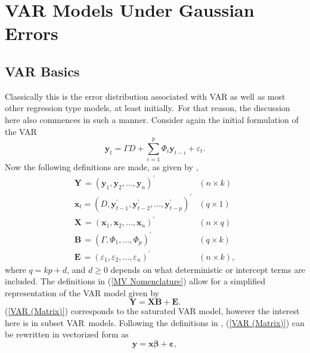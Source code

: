 
\chapter{VAR Models Under Gaussian Errors}


\section{VAR Basics}

Classically this is the error distribution associated with VAR as
well as most other regression type models, at least initially.\ For
that reason, the discussion here also commences in such a manner.
Consider again the initial formulation of the VAR
\begin{equation}
\mathbf{y}_{t}=\Gamma D+\sum_{i=1}^{p}\Phi_{i}\mathbf{y}_{t-i}+\varepsilon_{t}.\label{VAR (Basic)}
\end{equation}
Now the following definitions are made, as given by \citet{Luetk:1993},
\begin{equation}
\begin{array}{ll}
\mathbf{Y}\,=\left(\mathbf{y}_{1},\mathbf{y}_{2},\ldots,\mathbf{y}_{n}\right)^{\prime} & \left(n\times k\right)\\
\mathbf{x}_{t}=\left(D,\mathbf{y}_{t-1}^{\prime},\mathbf{y}_{t-2}^{\prime},\ldots,\mathbf{y}_{t-p}^{\prime}\right)^{\prime} & (q\times1)\\
\mathbf{X}\,=\left(\mathbf{x}_{1},\mathbf{x}_{2},\ldots,\mathbf{x}_{n}\right)^{\prime} & \left(n\times q\right)\\
\mathbf{B}\,=\left(\Gamma,\Phi_{1},\ldots,\Phi_{p}\right)^{\prime} & \left(q\times k\right)\\
\mathbf{E}\,=\left(\varepsilon_{1},\varepsilon_{2},\ldots,\varepsilon_{n}\right)^{\prime} & \left(n\times k\right),
\end{array}\label{MV Nomenclature}
\end{equation}
where $q=kp+d$, and $d\geq0$ depends on what deterministic or intercept
terms are included. The definitions in (\ref{MV Nomenclature}) allow
for a simplified representation of the VAR model given by
\begin{equation}
\mathbf{Y}=\mathbf{XB}+\mathbf{E.}\label{VAR (Matrix)}
\end{equation}
(\ref{VAR (Matrix)}) corresponds to the saturated VAR model, however
the interest here is in subset VAR\ models. Following the definitions
in \citet{Luetk:1993}, (\ref{VAR (Matrix)}) can be rewritten in
vectorized form as
\begin{equation}
\mathbf{y}=\mathbf{x\beta}+\mathbf{\varepsilon},\label{VAR (Vec)}
\end{equation}
